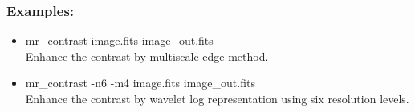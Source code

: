 \subsubsection*{Examples:}
\begin{itemize}
\baselineskip=0.4truecm
\itemsep=0.1truecm
\item mr\_contrast image.fits image\_out.fits\\
Enhance the contrast by multiscale edge method.
\item mr\_contrast -n6 -m4 image.fits image\_out.fits\\
Enhance the contrast by wavelet log representation using six
resolution levels.
\end{itemize}
